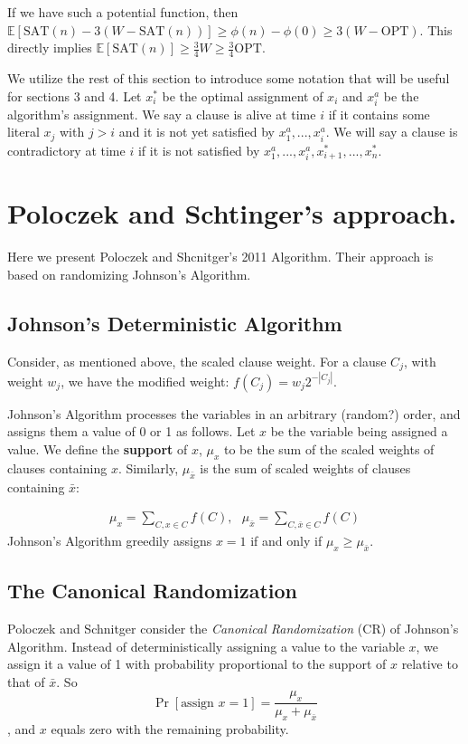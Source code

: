 \documentclass[11pt,letter]{article}
\begin{document}
If we have such a potential function, then $\mathbb{E}[\text{SAT}(n)- 3\left(W-\text{SAT}(n)\right)] \geq \phi(n) - \phi(0) \geq 3(W-\text{OPT})$.
This directly implies $\mathbb{E}[\text{SAT}(n)] \geq \frac{3}{4} W \geq \frac{3}{4} \text{OPT}$.

We utilize the rest of this section to introduce some notation that will be useful for sections 3 and 4.
Let $x_i^*$ be the optimal assignment of $x_i$ and $x_i^{a}$ be the algorithm's assignment. We say a clause is alive
at time $i$ if it contains some literal $x_j$ with $j > i$ and it is not yet satisfied by $x_1^a,...,x_i^a$.
We will say a clause is contradictory at time $i$ if it is not satisfied by $x_1^a,...,x_i^a,x_{i+1}^*,...,x_n^*$.

\section{Poloczek and Schtinger's approach.}

Here we present Poloczek and Shcnitger's 2011 Algorithm. Their approach is based on randomizing Johnson's Algorithm.

\subsection{Johnson's Deterministic Algorithm}

Consider, as mentioned above, the scaled clause weight. For a clause $C_j$, with weight $w_j$, we have the modified weight:  $f(C_j) = w_j 2^{-|C_j|}$.

Johnson's Algorithm processes the variables in an arbitrary (random?) order, and assigns them a value of 0 or 1 as follows. Let $x$ be the variable being assigned a value. We define the \textbf{support} of $x$, $\mu_x$ to be the sum of the scaled weights of clauses containing $x$. Similarly, $\mu_{\bar{x}}$ is the sum of scaled weights of clauses containing $\bar{x}$:

\begin{align*}
\mu_x = \sum_{C,x\in C}f(C), \,\,\,\, \mu_{\bar{x}} =\sum_{C,\bar{x}\in C}f(C)
\end{align*}
Johnson's Algorithm greedily assigns $x=1$ if and only if $\mu_x \ge \mu_{\bar{x}}$.

\subsection{The Canonical Randomization}
Poloczek and Schnitger consider the \textit{Canonical Randomization} (CR) of Johnson's Algorithm. Instead of deterministically assigning a value to the variable $x$, we assign it a value of 1 with probability proportional to the support of $x$ relative to that of $\bar{x}$. So
$$ \Pr[\text{assign } x=1] = \frac{\mu_x}{\mu_x + \mu_{\bar{x}}}$$, and $x$ equals zero with the remaining probability.
\end{document}

